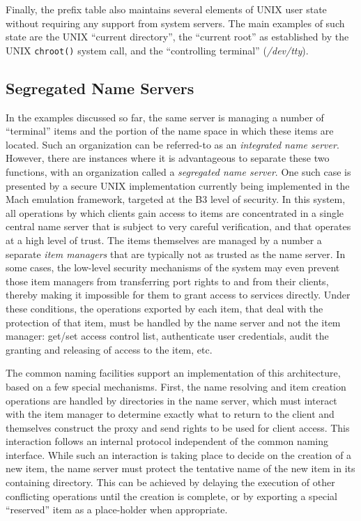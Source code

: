 Finally, the prefix table also maintains several elements of UNIX user
state without requiring any support from system servers. The main
examples of such state are the UNIX ``current directory'', the
``current root'' as established by the UNIX {\tt chroot()} system
call, and the ``controlling terminal'' ({\em /dev/tty}).

\subsection{Segregated Name Servers}

In the examples discussed so far, the same server is managing a number
of ``terminal'' items and the portion of the name space in which these
items are located. Such an organization can be referred-to as an {\em
integrated name server}.  However, there are instances where it is
advantageous to separate these two functions, with an organization
called a {\em segregated name server}. One such case is presented by a
secure UNIX implementation currently being implemented in the Mach
emulation framework, targeted at the B3 level of
security\cite{GRAHAM90}. In this system, all operations by which
clients gain access to items are concentrated in a single central name
server that is subject to very careful verification, and that operates
at a high level of trust. The items themselves are managed by a number
a separate {\em item managers} that are typically not as trusted as
the name server. In some cases, the low-level security mechanisms of
the system may even prevent those item managers from transferring port
rights to and from their clients, thereby making it impossible for
them to grant access to services directly.  Under these conditions,
the operations exported by each item, that deal with the protection of
that item, must be handled by the name server and not the item
manager: get/set access control list, authenticate user credentials,
audit the granting and releasing of access to the item, etc.

The common naming facilities support an implementation of this
architecture, based on a few special mechanisms. First, the name
resolving and item creation operations are handled by directories in
the name server, which must interact with the item manager to
determine exactly what to return to the client and themselves
construct the proxy and send rights to be used for client access. This
interaction follows an internal protocol independent of the common
naming interface. While such an interaction is taking place to decide
on the creation of a new item, the name server must protect the
tentative name of the new item in its containing directory. This can
be achieved by delaying the execution of other conflicting operations
until the creation is complete, or by exporting a special ``reserved''
item as a place-holder when appropriate.

